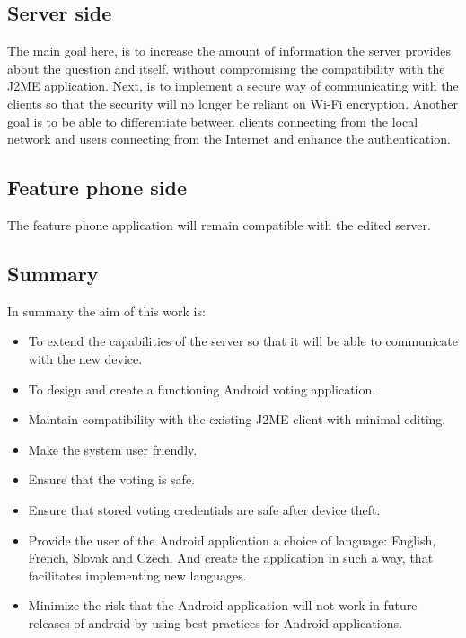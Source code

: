 \documentclass[11pt,twoside,a4paper]{book}
\begin{document}
\subsection{Server side}
The main goal here, is to increase the amount of information the server provides about the question and itself. without compromising the compatibility with the J2ME application. Next, is to implement a secure way of communicating with the clients so that the security will no longer be reliant on Wi-Fi encryption. Another goal is to be able to differentiate between clients connecting from the local network and users connecting from the Internet and enhance the authentication.




\subsection{Feature phone side}
The feature phone application will remain compatible with the edited server. \\

\subsection{Summary}
In summary the aim of this work is:

\begin{itemize}
\item To extend the capabilities of the server so that it will be able to communicate with the new device.
\item To design and create a functioning Android voting application.
\item Maintain compatibility with the existing J2ME client with minimal editing.
\item Make the system user friendly.
\item Ensure that the voting is safe.
\item Ensure that stored voting credentials are safe after device theft.
\item Provide the user of the Android application a choice of language: English, French, Slovak and Czech. And create the application in such a way, that facilitates implementing new languages.
\item Minimize the risk that the Android application will not work in future releases of android by using best practices for Android applications.
\end{itemize}
\end{document}
